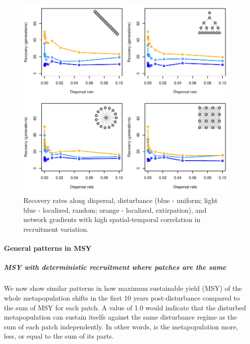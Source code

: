 \documentclass[]{article}
\let\oldparagraph\paragraph
\renewcommand{\paragraph}[1]{\oldparagraph{#1}\mbox{}}
\let\oldsubparagraph\subparagraph
\renewcommand{\subparagraph}[1]{\oldsubparagraph{#1}\mbox{}}
\begin{document}
\begin{figure}[H]

{\centering \includegraphics{Managing_for_ecological_surprises_in_metapopulations_makeHTML_files/figure-latex/spatiotemporal correlation-1} 

}

\caption{Recovery rates along dispersal, disturbance (blue - uniform; light blue - localized, random; orange - localized, extirpation), and network gradients with high spatial-temporal correlation in recruitment variation.}\label{fig:spatiotemporal correlation}
\end{figure}

\hypertarget{general-patterns-in-msy}{%
\paragraph{General patterns in MSY}\label{general-patterns-in-msy}}

\hypertarget{msy-with-deterministic-recruitment-where-patches-are-the-same}{%
\subparagraph{MSY with deterministic recruitment where patches are the
same}\label{msy-with-deterministic-recruitment-where-patches-are-the-same}}

We now show similar patterns in how maximum sustainable yield (MSY) of
the whole metapopulation shifts in the first 10 years post-disturbance
compared to the sum of MSY for each patch. A value of 1.0 would indicate
that the disturbed metapopulation can sustain itselfs against the same
disturbance regime as the sum of each patch independently. In other
words, is the metapopulation more, less, or equal to the sum of its
parts.
\end{document}
